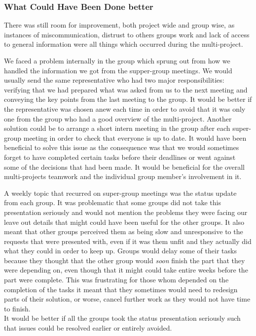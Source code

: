 \subsubsection*{What Could Have Been Done better}
There was still room for improvement, both project wide and group wise, as instances of miscommunication, distrust to others groups work and lack of access to general information were all things %
 which occurred during the multi-project.

We faced a problem internally in the group which sprung out from how we handled the information we got from the supper-group meetings. We would usually send the same representative who had two major responsibilities: verifying that we had prepared what was asked from us to the next meeting and conveying the key points from the last meeting to the group. It would be better if the representative was chosen anew each time in order to avoid that it was only one from the group who had a good overview of the multi-project. Another solution could be to arrange a short intern meeting in the group after each super-group meeting in order to check that everyone is up to date. It would have been beneficial to solve this issue as the consequence was that we would sometimes forget to have completed certain tasks before their deadlines or went against some of the decisions that had been made. It would be beneficial for the overall multi-projects teamwork and the individual group member's involvement in it.

A weekly topic that recurred on super-group meetings was the status update from each group. It was problematic that some groups did not take this presentation seriously and would not mention the problems they were facing our leave out details that might could have been useful for the other groups. It also meant that other groups perceived them as being slow and unresponsive to the requests that were presented with, even if it was them unfit and they actually did what they could in order to keep up. Groups would delay some of their tasks because they thought that the other group would \textit{soon} finish the part that they were depending on, even though that it might could take entire weeks before the part were complete. This was frustrating for those whom depended on the completion of the tasks it meant that they sometimes would need to redesign parts of their solution, or worse, cancel further work as they would not have time to finish. \\
It would be better if all the groups took the status presentation seriously such that issues could be resolved earlier or entirely avoided. %

